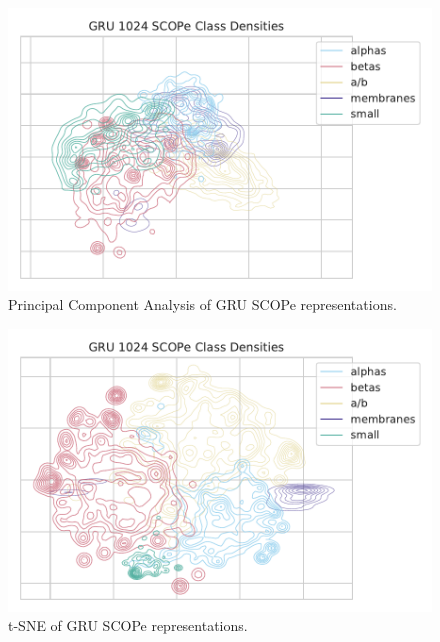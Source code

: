 \documentclass[a4paper,12pt]{article}
\begin{document}
\begin{minipage}{\linewidth}
	\centering
	\begin{minipage}{0.48\linewidth}
		\begin{figure}[H]
			\includegraphics[width=\linewidth]{figures/fig2c_GRU_1024_no_trunc_PCA.pdf}
			\caption{Principal Component Analysis of GRU SCOPe representations.}
			\label{fig:GRU_pca_compare}
		\end{figure}
	\end{minipage}
	\hfill
	\begin{minipage}{0.48\linewidth}
		\begin{figure}[H]
			\includegraphics[width=\linewidth]{figures/fig2c_GRU_1024_no_trunc.pdf}
			\caption{t-SNE of GRU SCOPe representations.}
			\label{fig:GRU_tSNE_compare}
		\end{figure}
	\end{minipage}
\end{minipage}
\end{document}
